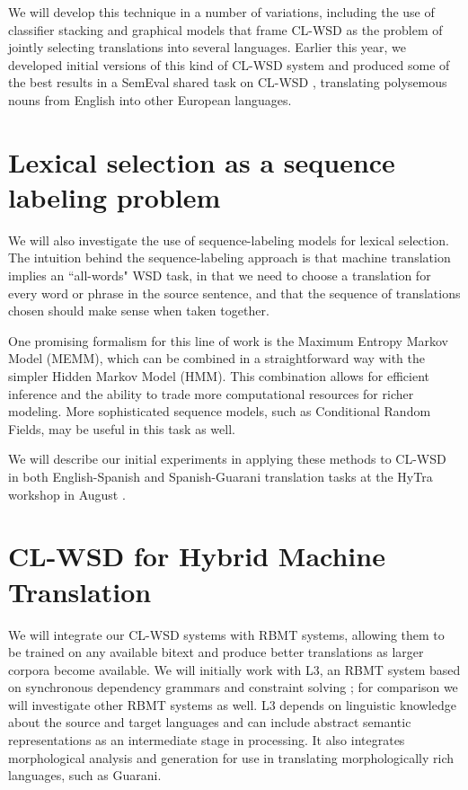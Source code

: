 \documentclass{article}
\begin{document}
We will develop this technique in a number of variations, including the use of
classifier stacking and graphical models that frame CL-WSD as the problem
of jointly selecting translations into several languages. Earlier this year,
we developed initial versions of this kind of CL-WSD system
\cite{rudnick-liu-gasser:2013:SemEval-2013} and produced some of the best
results in a SemEval shared task on CL-WSD \cite{task10},
translating polysemous nouns from English into other European languages.

\section{Lexical selection as a sequence labeling problem}
We will also investigate the use of sequence-labeling models for
lexical selection.  The intuition behind the sequence-labeling approach is that
machine translation implies an ``all-words" WSD task, in that we need to choose
a translation for every word or phrase in the source sentence, and that the
sequence of translations chosen should make sense when taken together.

One promising formalism for this line of work is the Maximum
Entropy Markov Model (MEMM), which can be combined in a straightforward way
with the simpler Hidden Markov Model (HMM). This combination allows for
efficient inference and the ability to trade more computational resources for
richer modeling. More sophisticated sequence models, such as Conditional Random
Fields, may be useful in this task as well.

We will describe our initial experiments in applying these methods to CL-WSD in
both English-Spanish and Spanish-Guarani translation tasks at the HyTra
workshop in August \cite{rudnick-gasser:2013:HyTra-2013}.

\section{CL-WSD for Hybrid Machine Translation}
We will integrate our CL-WSD systems with RBMT systems, allowing them
to be trained on any available bitext and produce better translations as larger
corpora become available.
We will initially work with L3, an RBMT system based on synchronous dependency
grammars and constraint solving \cite{gasser:sxdg,gasser:aflat2012};
for comparison we will investigate other RBMT systems as well. L3
depends on linguistic knowledge about the source and target languages and can
include abstract semantic representations as an intermediate stage in
processing. It also integrates morphological analysis and generation for
use in translating morphologically rich languages, such as Guarani.
\end{document}
